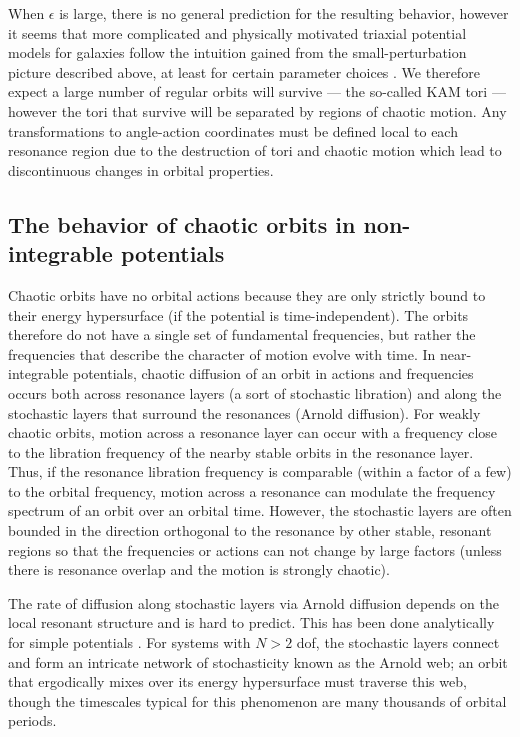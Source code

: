 \documentclass[letterpaper,12pt,preprint]{aastex}
\begin{document}
When $\epsilon$ is large, there is no general prediction for the resulting behavior, however it seems that more complicated and physically motivated triaxial potential models for galaxies follow the intuition gained from the small-perturbation picture described above, at least for certain parameter choices \citep[e.g.,][]{valluri98, merritt99}. We therefore expect a large number of regular orbits will survive --- the so-called KAM tori --- however the tori that survive will be separated by regions of chaotic motion. Any transformations to angle-action coordinates must be defined local to each resonance region due to the destruction of tori and chaotic motion which lead to discontinuous changes in orbital properties.

\subsection{The behavior of chaotic orbits in non-integrable potentials}\label{sec:behavior-chaotic}

Chaotic orbits have no orbital actions because they are only strictly bound to their energy hypersurface (if the potential is time-independent). The orbits therefore do not have a single set of fundamental frequencies, but rather the frequencies that describe the character of motion evolve with time. In near-integrable potentials, chaotic diffusion of an orbit in actions and frequencies occurs both across resonance layers (a sort of stochastic libration) and along the stochastic layers that surround the resonances (Arnold diffusion). For weakly chaotic orbits, motion across a resonance layer can occur with a frequency close to the libration frequency of the nearby stable orbits in the resonance layer. Thus, if the resonance libration frequency is comparable (within a factor of a few) to the orbital frequency, motion across a resonance can modulate the frequency spectrum of an orbit over an orbital time. However, the stochastic layers are often bounded in the direction orthogonal to the resonance by other stable, resonant regions so that the frequencies or actions can not change by large factors (unless there is resonance overlap and the motion is strongly chaotic). 

The rate of diffusion along stochastic layers via Arnold diffusion depends on the local resonant structure and is hard to predict. This has been done analytically for simple potentials \citep[e.g.,][]{chirikov79}. For systems with $N>2$ dof, the stochastic layers connect and form an intricate network of stochasticity known as the Arnold web; an orbit that ergodically mixes over its energy hypersurface must traverse this web, though the timescales typical for this phenomenon are many thousands of orbital periods. 
\end{document}
